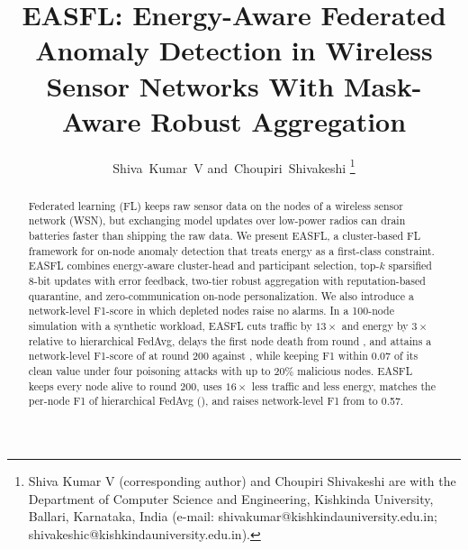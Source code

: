 \documentclass[journal]{IEEEtran}
\begin{document}
\title{EASFL: Energy-Aware Federated Anomaly Detection in Wireless Sensor Networks With Mask-Aware Robust Aggregation}

\author{Shiva~Kumar~V
and~Choupiri~Shivakeshi
\thanks{Shiva Kumar V (corresponding author) and Choupiri Shivakeshi are with the Department of Computer Science and Engineering, Kishkinda University, Ballari, Karnataka, India (e-mail: shivakumar@kishkindauniversity.edu.in; shivakeshic@kishkindauniversity.edu.in).}}


\maketitle

\begin{abstract}
Federated learning (FL) keeps raw sensor data on the nodes of a wireless sensor network (WSN), but exchanging model updates over low-power radios can drain batteries faster than shipping the raw data. We present EASFL, a cluster-based FL framework for on-node anomaly detection that treats energy as a first-class constraint. EASFL combines energy-aware cluster-head and participant selection, top-$k$ sparsified 8-bit updates with error feedback, two-tier robust aggregation with reputation-based quarantine, and zero-communication on-node personalization.  We also introduce a network-level F1-score in which depleted nodes raise no alarms. In a 100-node simulation with a synthetic workload, EASFL cuts traffic by $13\times$ and energy by $3\times$ relative to hierarchical FedAvg, delays the first node death from round , and attains a network-level F1-score of  at round 200 against , while keeping F1 within 0.07 of its clean value under four poisoning attacks with up to 20\% malicious nodes.  EASFL keeps every node alive to round 200, uses $16\times$ less traffic and \rev{$3.2\times$} less energy, matches the per-node F1 of hierarchical FedAvg (), and raises network-level F1 from  to 0.57. 
\end{abstract}
\end{document}
